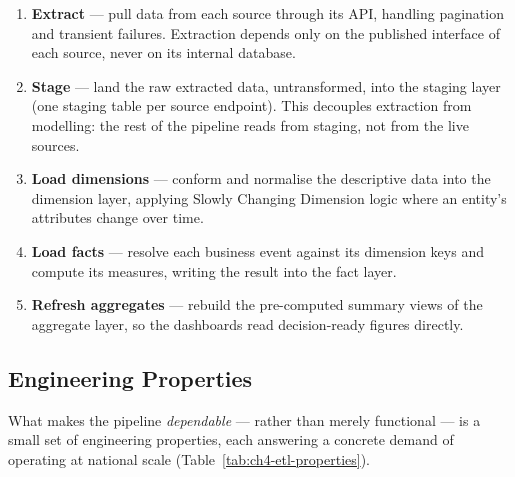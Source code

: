 \begin{enumerate}[noitemsep]
    \item \textbf{Extract} --- pull data from each source through its API, handling pagination and
          transient failures. Extraction depends only on the published interface of each source, never
          on its internal database.
    \item \textbf{Stage} --- land the raw extracted data, untransformed, into the staging layer (one
          staging table per source endpoint). This decouples extraction from modelling: the rest of the
          pipeline reads from staging, not from the live sources.
    \item \textbf{Load dimensions} --- conform and normalise the descriptive data into the dimension
          layer, applying Slowly Changing Dimension logic where an entity's attributes change over time.
    \item \textbf{Load facts} --- resolve each business event against its dimension keys and compute its
          measures, writing the result into the fact layer.
    \item \textbf{Refresh aggregates} --- rebuild the pre-computed summary views of the aggregate layer,
          so the dashboards read decision-ready figures directly.
\end{enumerate}

\subsection{Engineering Properties}

What makes the pipeline \emph{dependable} --- rather than merely functional --- is a small set of
engineering properties, each answering a concrete demand of operating at national scale
(Table~\ref{tab:ch4-etl-properties}).

